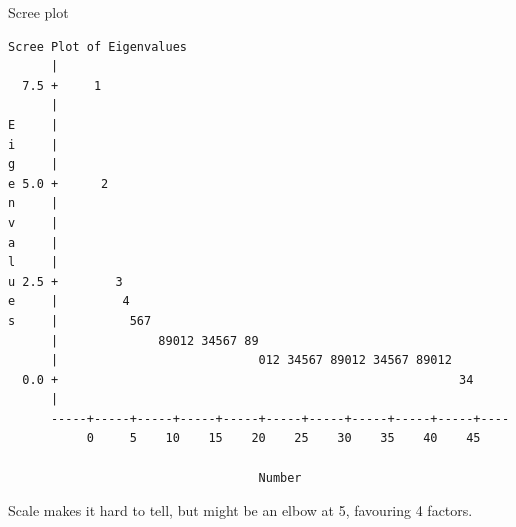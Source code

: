 \documentclass[pdf]{prosper}
\begin{document}
\begin{slide}{Scree plot}

{\tiny
\begin{verbatim}
Scree Plot of Eigenvalues
      |
  7.5 +     1
      |
E     |
i     |
g     |
e 5.0 +      2
n     |
v     |
a     |
l     |
u 2.5 +        3
e     |         4
s     |          567
      |              89012 34567 89
      |                            012 34567 89012 34567 89012
  0.0 +                                                        34
      |
      -----+-----+-----+-----+-----+-----+-----+-----+-----+-----+----
           0     5    10    15    20    25    30    35    40    45

                                   Number

\end{verbatim}
}

Scale makes it hard to tell, but might be an elbow at 5, favouring 4 factors.
  
\end{slide}
\end{document}
